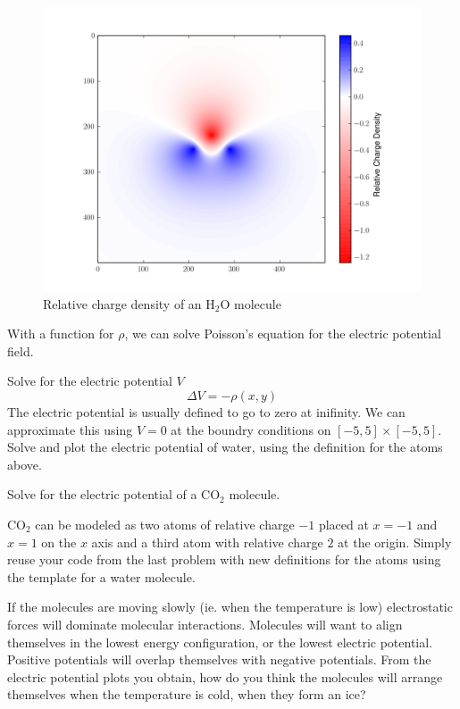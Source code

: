 \begin{figure}
\centering
\includegraphics[width=12cm]{waterRho.png}
\caption{Relative charge density of an H$_2$O molecule}
\end{figure}

With a function for $\rho$, we can solve Poisson's equation for the electric potential field.
\begin{problem}
Solve for the electric potential $V$
\[\Delta V = -\rho(x,y)\]
The electric potential is usually defined to go to zero at inifinity.
We can approximate this using $V=0$ at the boundry conditions on $[-5,5]\times [-5,5]$.
Solve and plot the electric potential of water, using the definition for the atoms above.

\end{problem}

\begin{problem}
Solve for the electric potential of a CO$_2$ molecule.

CO$_2$ can be modeled as two atoms of relative charge $-1$ placed at $x=-1$ and $x=1$ on the $x$ axis and a third atom with relative charge $2$ at the origin.
Simply reuse your code from the last problem with new definitions for the atoms using the template for a water molecule.

If the molecules are moving slowly (ie. when the temperature is low) electrostatic forces will dominate molecular interactions.
Molecules will want to align themselves in the lowest energy configuration, or the lowest electric potential.
Positive potentials will overlap themselves with negative potentials.
From the electric potential plots you obtain, how do you think the molecules will arrange themselves when the temperature is cold, when they form an ice?
\end{problem}

